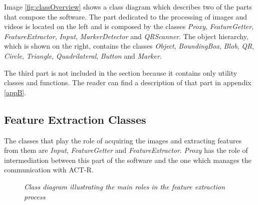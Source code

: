 	Image \ref{fig:classOverview} shows a class diagram which describes two of the parts that compose the software. 
	The part dedicated to the processing of images and videos is located on the left and is composed by the classes \emph{Proxy}, \emph{FeatureGetter}, \emph{FeatureExtractor}, \emph{Input}, \emph{MarkerDetector} and \emph{QRScanner}.
	The object hierarchy, which is shown on the right, contains the classes \emph{Object}, \emph{BoundingBox}, \emph{Blob}, \emph{QR}, \emph{Circle}, \emph{Triangle}, \emph{Quadrilateral}, \emph{Button} and \emph{Marker}.

	The third part is not included in the section because it contains only utility classes and functions. 
	The reader can find a description of that part in appendix \ref{appB}. 

		\subsection{Feature Extraction Classes}\label{featExtraction}	
		The classes that play the role of acquiring the images and extracting features from them are \emph{Input}, \emph{FeatureGetter} and \emph{FeatureExtractor}. \emph{Proxy} has the role of intermediation between this part of the software and the one which manages the communication with \mbox{ACT-R}.

		\begin{figure}[h]
		  \begin{center} 
		  \end{center} 
		  \caption{\textit{Class diagram illustrating the main roles in the feature extraction process}}  
		  \label{fig:FeatureDesign}
	 	\end{figure}
	
